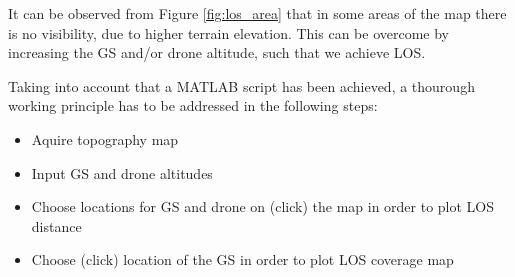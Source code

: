 It can be observed from Figure \ref{fig:los_area} that in some areas of the map there is no visibility, due to higher terrain elevation. This can be overcome by increasing the GS and/or drone altitude, such that we achieve LOS.  

Taking into account that a MATLAB script has been achieved, a thourough working principle has to be addressed in the following steps:
\begin{itemize}
	\item Aquire topography map 
	\item Input GS and drone altitudes
	\item Choose locations for GS and drone on (click) the map in order to plot LOS distance
	\item Choose (click) location of the GS in order to plot LOS coverage map
\end{itemize}